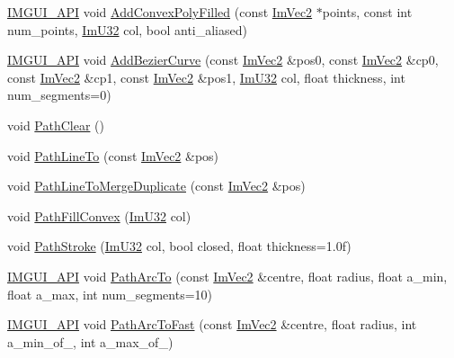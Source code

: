 \begin{DoxyCompactItemize}
\item 
\mbox{\hyperlink{imgui_8h_a43829975e84e45d1149597467a14bbf5}{I\+M\+G\+U\+I\+\_\+\+A\+PI}} void \mbox{\hyperlink{struct_im_draw_list_a3ba618d0615e410dce9eaa0b80a30126}{Add\+Convex\+Poly\+Filled}} (const \mbox{\hyperlink{struct_im_vec2}{Im\+Vec2}} $\ast$points, const int num\+\_\+points, \mbox{\hyperlink{imgui_8h_a118cff4eeb8d00e7d07ce3d6460eed36}{Im\+U32}} col, bool anti\+\_\+aliased)
\item 
\mbox{\hyperlink{imgui_8h_a43829975e84e45d1149597467a14bbf5}{I\+M\+G\+U\+I\+\_\+\+A\+PI}} void \mbox{\hyperlink{struct_im_draw_list_afd2eeeb8ed23b6222513953b03620101}{Add\+Bezier\+Curve}} (const \mbox{\hyperlink{struct_im_vec2}{Im\+Vec2}} \&pos0, const \mbox{\hyperlink{struct_im_vec2}{Im\+Vec2}} \&cp0, const \mbox{\hyperlink{struct_im_vec2}{Im\+Vec2}} \&cp1, const \mbox{\hyperlink{struct_im_vec2}{Im\+Vec2}} \&pos1, \mbox{\hyperlink{imgui_8h_a118cff4eeb8d00e7d07ce3d6460eed36}{Im\+U32}} col, float thickness, int num\+\_\+segments=0)
\item 
void \mbox{\hyperlink{struct_im_draw_list_ae9ad5f4d638b1bfd9383618dc60e3f18}{Path\+Clear}} ()
\item 
void \mbox{\hyperlink{struct_im_draw_list_a828d944325ed58d8b57abd3647bffaaf}{Path\+Line\+To}} (const \mbox{\hyperlink{struct_im_vec2}{Im\+Vec2}} \&pos)
\item 
void \mbox{\hyperlink{struct_im_draw_list_aa3dd11945fb62495f8b9e1392ed724e3}{Path\+Line\+To\+Merge\+Duplicate}} (const \mbox{\hyperlink{struct_im_vec2}{Im\+Vec2}} \&pos)
\item 
void \mbox{\hyperlink{struct_im_draw_list_aea9301cb99ebf4b27f5d3959017567c9}{Path\+Fill\+Convex}} (\mbox{\hyperlink{imgui_8h_a118cff4eeb8d00e7d07ce3d6460eed36}{Im\+U32}} col)
\item 
void \mbox{\hyperlink{struct_im_draw_list_ac3172e376a4b77915bb22b6d8092b8b2}{Path\+Stroke}} (\mbox{\hyperlink{imgui_8h_a118cff4eeb8d00e7d07ce3d6460eed36}{Im\+U32}} col, bool closed, float thickness=1.\+0f)
\item 
\mbox{\hyperlink{imgui_8h_a43829975e84e45d1149597467a14bbf5}{I\+M\+G\+U\+I\+\_\+\+A\+PI}} void \mbox{\hyperlink{struct_im_draw_list_acb69ef7febcc54c9e5e09d2460c85b61}{Path\+Arc\+To}} (const \mbox{\hyperlink{struct_im_vec2}{Im\+Vec2}} \&centre, float radius, float a\+\_\+min, float a\+\_\+max, int num\+\_\+segments=10)
\item 
\mbox{\hyperlink{imgui_8h_a43829975e84e45d1149597467a14bbf5}{I\+M\+G\+U\+I\+\_\+\+A\+PI}} void \mbox{\hyperlink{struct_im_draw_list_a713cca3862e88aa1ee671db1c4cf6bdb}{Path\+Arc\+To\+Fast}} (const \mbox{\hyperlink{struct_im_vec2}{Im\+Vec2}} \&centre, float radius, int a\+\_\+min\+\_\+of\+\_, int a\+\_\+max\+\_\+of\+\_)

\end{DoxyCompactItemize}
